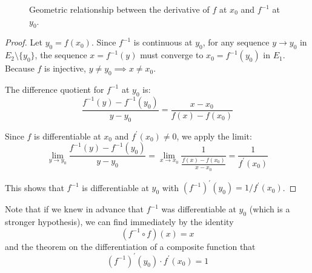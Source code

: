 \begin{theorem}
\begin{figure}[H]
      \caption{Geometric relationship between the derivative of $f$ at $x_0$ and $f^{-1}$ at $y_0$.}
    \end{figure}
  \end{theorem}
  \begin{proof}
    Let $y_0 = f(x_0)$. Since $f^{-1}$ is continuous at $y_0$, for any sequence $y \to y_0$ in $E_2 \setminus \{y_0\}$, the sequence $x = f^{-1}(y)$ must converge to $x_0 = f^{-1}(y_0)$ in $E_1$. Because $f$ is injective, $y \neq y_0 \implies x \neq x_0$.

    The difference quotient for $f^{-1}$ at $y_0$ is:
    \begin{equation}
      \frac{f^{-1}(y) - f^{-1}(y_0)}{y - y_0} = \frac{x - x_0}{f(x) - f(x_0)}
    \end{equation}

    Since $f$ is differentiable at $x_0$ and $f^\prime(x_0) \neq 0$, we apply the limit:
    \begin{equation}
      \lim_{y \to y_0} \frac{f^{-1}(y) - f^{-1}(y_0)}{y - y_0} = \lim_{x \to x_0} \frac{1}{\frac{f(x) - f(x_0)}{x - x_0}} = \frac{1}{f^\prime(x_0)}
    \end{equation}

    This shows that $f^{-1}$ is differentiable at $y_0$ with $(f^{-1})^\prime(y_0) = 1/f^\prime(x_0)$.
  \end{proof}

  Note that if we knew in advance that $f^{-1}$ was differentiable at $y_0$ (which is a stronger hypothesis), we can find immediately by the identity 
  \begin{equation}
    (f^{-1} \circ f) (x) = x
  \end{equation}
  and the theorem on the differentiation of a composite function that
  \begin{equation}
    (f^{-1})^\prime (y_0) \cdot f^\prime (x_0) = 1
  \end{equation}

